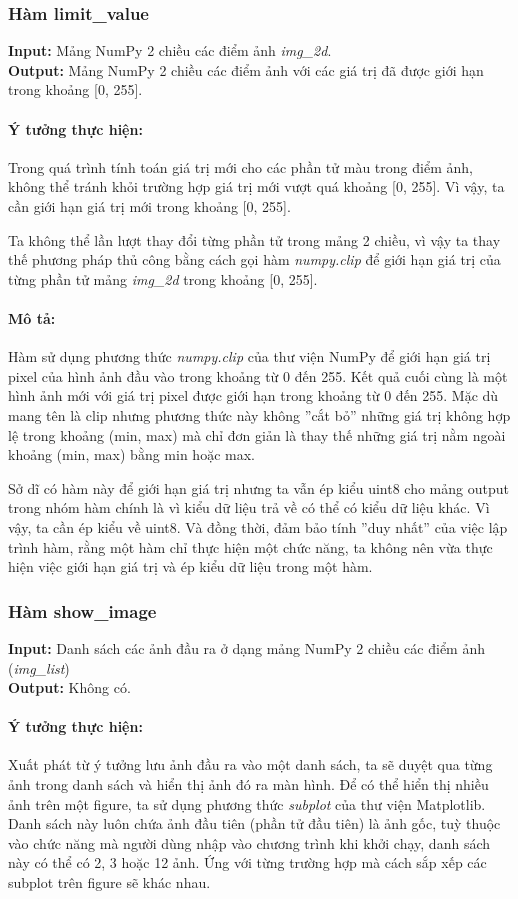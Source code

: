 \documentclass[]{article}
\begin{document}
\subsubsection{Hàm limit\_value}
\textbf{Input:} Mảng NumPy 2 chiều các điểm ảnh \textit{img\_2d}. \\
\textbf{Output:} Mảng NumPy 2 chiều các điểm ảnh với các giá trị đã được giới hạn trong khoảng [0, 255].

\paragraph{Ý tưởng thực hiện:} Trong quá trình tính toán giá trị mới cho các phần tử màu trong điểm ảnh, không thể tránh khỏi trường hợp giá trị mới vượt quá khoảng [0, 255]. Vì vậy, ta cần giới hạn giá trị mới trong khoảng [0, 255]. \par
Ta không thể lần lượt thay đổi từng phần tử trong mảng 2 chiều, vì vậy ta thay thế phương pháp thủ công bằng cách gọi hàm \textit{numpy.clip} để giới hạn giá trị của từng phần tử mảng \textit{img\_2d} trong khoảng [0, 255].
\paragraph{Mô tả:} Hàm sử dụng phương thức \textit{numpy.clip} của thư viện NumPy để giới hạn giá trị pixel của hình ảnh đầu vào trong khoảng từ 0 đến 255. Kết quả cuối cùng là một hình ảnh mới với giá trị pixel được giới hạn trong khoảng từ 0 đến 255. Mặc dù mang tên là clip nhưng phương thức này không ''cắt bỏ'' những giá trị không hợp lệ trong khoảng (min, max) mà chỉ đơn giản là thay thế những giá trị nằm ngoài khoảng (min, max) bằng min hoặc max. \par
Sở dĩ có hàm này để giới hạn giá trị nhưng ta vẫn ép kiểu uint8 cho mảng output trong nhóm hàm chính là vì kiểu dữ liệu trả về có thể có kiểu dữ liệu khác. Vì vậy, ta cần ép kiểu về uint8. Và đồng thời, đảm bảo tính ''duy nhất'' của việc lập trình hàm, rằng một hàm chỉ thực hiện một chức năng, ta không nên vừa thực hiện việc giới hạn giá trị và ép kiểu dữ liệu trong một hàm. 
\subsubsection{Hàm show\_image}
\textbf{Input:} Danh sách các ảnh đầu ra ở dạng mảng NumPy 2 chiều các điểm ảnh (\textit{img\_list}) \\
\textbf{Output:} Không có.

\paragraph{Ý tưởng thực hiện:} Xuất phát từ ý tưởng lưu ảnh đầu ra vào một danh sách, ta sẽ duyệt qua từng ảnh trong danh sách và hiển thị ảnh đó ra màn hình. Để có thể hiển thị nhiều ảnh trên một figure, ta sử dụng phương thức \textit{subplot} của thư viện Matplotlib. Danh sách này luôn chứa ảnh đầu tiên (phần tử đầu tiên) là ảnh gốc, tuỳ thuộc vào chức năng mà người dùng nhập vào chương trình khi khởi chạy, danh sách này có thể có 2, 3 hoặc 12 ảnh. Ứng với từng trường hợp mà cách sắp xếp các subplot trên figure sẽ khác nhau.  
\end{document}

